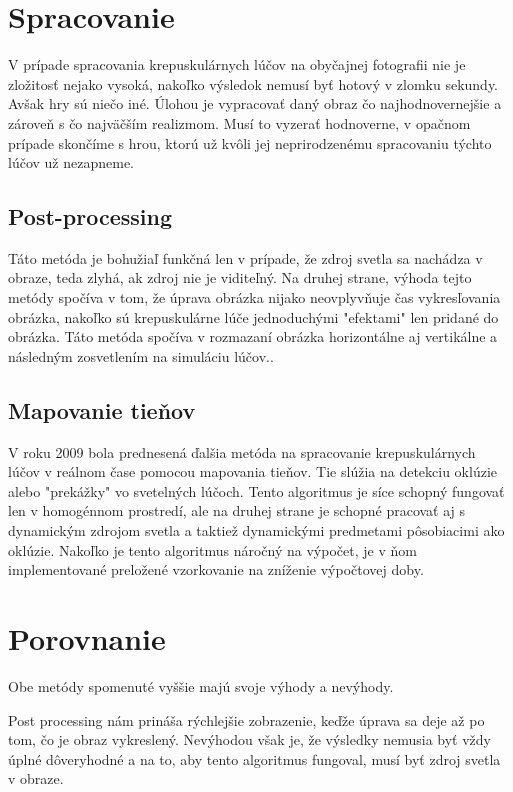 \documentclass[10pt,twoside,slovak,a4paper]{article}
\begin{document}
\section{Spracovanie} \label{spracovanie}
V prípade spracovania krepuskulárnych lúčov na obyčajnej fotografii nie je zložitosť 
nejako vysoká, nakoľko výsledok nemusí byť hotový v zlomku sekundy. Avšak hry sú niečo 
iné. Úlohou je vypracovať daný obraz čo najhodnovernejšie a zároveň s čo najväčším 
realizmom. Musí to vyzerať hodnoverne, v opačnom prípade skončíme s hrou, ktorú už 
kvôli jej neprirodzenému spracovaniu týchto lúčov už nezapneme.

\subsection{Post-processing} \label{spracovanie:pp}
Táto metóda je bohužiaľ funkčná len v prípade, že zdroj svetla sa nachádza v obraze, 
teda zlyhá, ak zdroj nie je viditeľný. Na druhej strane, výhoda tejto metódy spočíva 
v tom, že úprava obrázka nijako neovplyvňuje čas vykresľovania obrázka, nakoľko sú 
krepuskulárne lúče jednoduchými "efektami" len pridané do obrázka. Táto metóda spočíva 
v rozmazaní obrázka horizontálne aj vertikálne a následným zosvetlením na simuláciu 
lúčov.\cite{Light_shafts}.

\subsection{Mapovanie tieňov} \label{spracovanie:mt}
V roku 2009 bola prednesená ďalšia metóda na spracovanie krepuskulárnych lúčov v 
reálnom čase pomocou mapovania tieňov. Tie slúžia na detekciu oklúzie alebo "prekážky" 
vo svetelných lúčoch. Tento algoritmus je síce schopný fungovať len v homogénnom prostredí, 
ale na druhej strane je schopné pracovať aj s dynamickým zdrojom svetla a taktiež dynamickými 
predmetami pôsobiacimi ako oklúzie. Nakoľko je tento algoritmus náročný na výpočet, je v ňom 
implementované preložené vzorkovanie na zníženie výpočtovej doby\cite{God_rays}.

\section{Porovnanie} 
\label{por}
Obe metódy spomenuté vyššie majú svoje výhody  a nevýhody.

Post processing nám prináša rýchlejšie zobrazenie, keďže úprava sa deje až po tom, čo je 
obraz vykreslený. Nevýhodou však je, že výsledky nemusia byť vždy úplné dôveryhodné a na to, 
aby tento algoritmus fungoval, musí byť zdroj svetla v obraze. 
\end{document}
